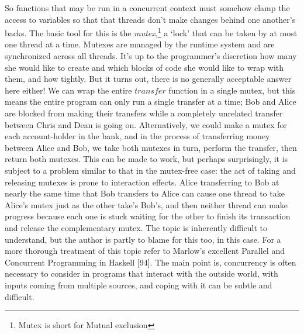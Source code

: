 \documentclass[]{article}
\begin{document}
So functions that may be run in a concurrent context must somehow clamp
the access to variables so that that threads don't make changes behind
one another's backs. The basic tool for this is the
\emph{mutex},\footnote{Mutex is short for Mutual exclusion} a `lock'
that can be taken by at most one thread at a time. Mutexes are managed
by the runtime system and are synchronized across all threads. It's up
to the programmer's discretion how many she would like to create and
which blocks of code she would like to wrap with them, and how tightly.
But it turns out, there is no generally acceptable answer here either!
We can wrap the entire \(transfer\) function in a single mutex, but this
means the entire program can only run a single transfer at a time; Bob
and Alice are blocked from making their transfers while a completely
unrelated transfer between Chris and Dean is going on. Alternatively, we
could make a mutex for each account-holder in the bank, and in the
process of transferring money between Alice and Bob, we take both
mutexes in turn, perform the transfer, then return both mutexes. This
can be made to work, but perhaps surprisingly, it is subject to a
problem similar to that in the mutex-free case: the act of taking and
releasing mutexes is prone to interaction effects. Alice transferring to
Bob at nearly the same time that Bob transfers to Alice can cause one
thread to take Alice's mutex just as the other take's Bob's, and then
neither thread can make progress because each one is stuck waiting for
the other to finish its transaction and release the complementary mutex.
The topic is inherently difficult to understand, but the author is
partly to blame for this too, in this case. For a more thorough
treatment of this topic refer to Marlow's excellent Parallel and
Concurrent Programming in Haskell {[}94{]}. The main point is,
concurrency is often necessary to consider in programs that interact
with the outside world, with inputs coming from multiple sources, and
coping with it can be subtle and difficult.
\end{document}
